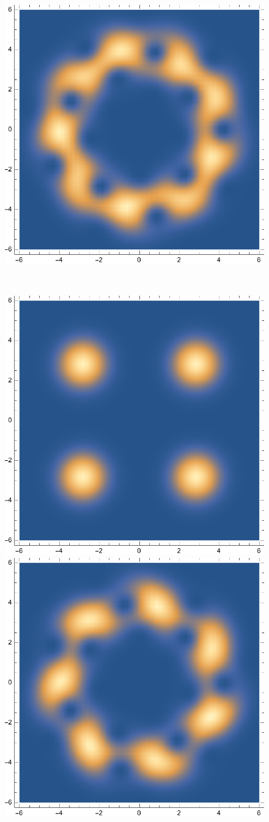 \documentclass{article}
\theoremstyle{definition}
\begin{document}
\begin{enumerate}[label=\alph*)]
\begin{figure}[!htb]
\begin{minipage}{.24\textwidth}
  	\includegraphics[width=.7\linewidth]{figures/5-28.eps}
	\end{minipage} \\ 
	\begin{minipage}{.24\textwidth}
  	\centering
  	\includegraphics[width=.7\linewidth]{figures/5-32.eps}
	\end{minipage}%
	\begin{minipage}{.24\textwidth}
  	\centering
  	\includegraphics[width=.7\linewidth]{figures/5-36.eps}

\end{minipage}
\end{figure}
\end{enumerate}
\end{document}
